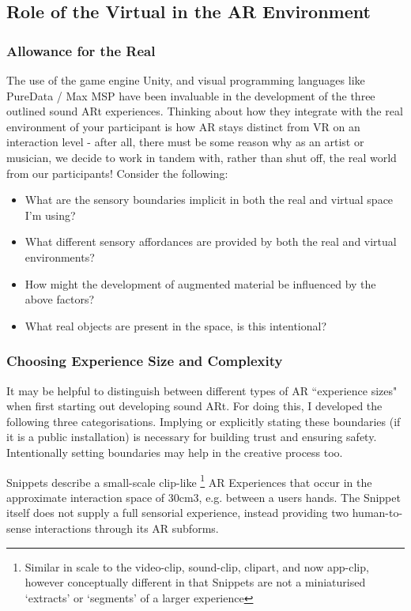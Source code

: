 \subsection{Role of the Virtual in the AR Environment} \label{sec: discussion-patterns-environment}
\subsubsection{Allowance for the Real}
The use of the game engine Unity, and visual programming languages like PureData / Max MSP have been invaluable in the development of the three outlined sound ARt experiences. Thinking about how they integrate with the real environment of your participant is how AR stays distinct from VR on an interaction level - after all, there must be some reason why as an artist or musician, we decide to work in tandem with, rather than shut off, the real world from our participants! Consider the following:
\begin{itemize}
    \item What are the sensory boundaries implicit in both the real and virtual space I'm using? 
    \item What different sensory affordances are provided by both the real and virtual environments? 
    \item How might the development of augmented material be influenced by the above factors?
    \item What real objects are present in the space, is this intentional?
\end{itemize}

\subsubsection{Choosing Experience Size and Complexity}
It may be helpful to distinguish between different types of AR ``experience sizes" when first starting out developing sound ARt. For doing this, I developed the following three categorisations. Implying or explicitly stating these boundaries (if it is a public installation) is necessary for building trust and ensuring safety. Intentionally setting boundaries may help in the creative process too.

Snippets describe a small-scale clip-like \footnote{Similar in scale to the video-clip, sound-clip, clipart, and now app-clip, however conceptually different in that Snippets are not a miniaturised `extracts' or `segments' of a larger experience} AR Experiences that occur in the approximate interaction space of 30cm3, e.g. between a users hands. The Snippet itself does not supply a full sensorial experience, instead providing two human-to-sense interactions through its AR subforms.

